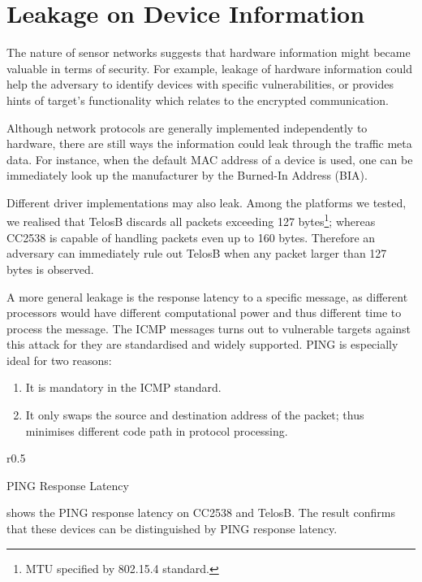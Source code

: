 \section{Leakage on Device Information}


The nature of sensor networks suggests that hardware information might became valuable in terms of security. For example, leakage of hardware information could help the adversary to identify devices with specific vulnerabilities, or provides hints of target's functionality which relates to the encrypted communication.

Although network protocols are generally implemented independently to hardware, there are still ways the information could leak through the traffic meta data. For instance, when the default MAC address of a device is used, one can be immediately look up the manufacturer by the Burned-In Address (BIA)\cite{BIA}.

Different driver implementations may also leak. Among the platforms we tested, we realised that TelosB\cite{TelosB} discards all packets exceeding 127 bytes\footnote{MTU specified by 802.15.4 standard.}; whereas CC2538 is capable of handling packets even up to 160 bytes. Therefore an adversary can immediately rule out TelosB when any packet larger than 127 bytes is observed.

A more general leakage is the response latency to a specific message, as different processors would have different computational power and thus different time to process the message. The ICMP messages turns out to vulnerable targets against this attack for they are standardised and widely supported. PING is especially ideal for two reasons: 
\begin{enumerate}
	\item It is mandatory in the ICMP standard.
	\item It only swaps the source and destination address of the packet; thus minimises different code path in protocol processing.
\end{enumerate}

\begin{table}{r}{0.5\textwidth}
	\center
	
	\caption{PING Response Latency\label{PingResponse}}
\end{table}

 shows the PING response latency on CC2538 and TelosB. The result confirms that these devices can be distinguished by PING response latency.



